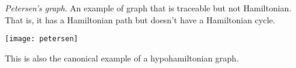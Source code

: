 \documentclass{article}
\begin{document}
\emph{Petersen's graph}. An example of graph that is traceable but not Hamiltonian. That is, it has a Hamiltonian path but doesn't have a Hamiltonian cycle.

\begin{center}
\texttt{[image: petersen]}
\end{center}

This is also the canonical example of a hypohamiltonian graph.
\end{document}
